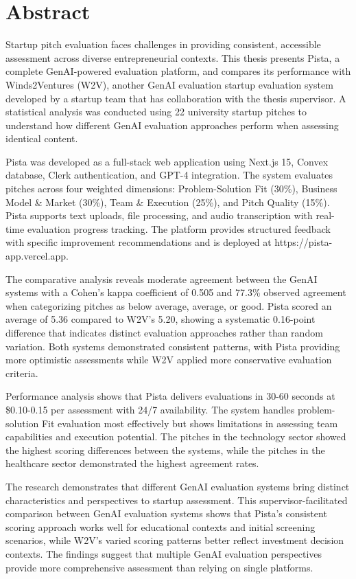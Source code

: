 \chapter*{Abstract}
Startup pitch evaluation faces challenges in providing consistent, accessible assessment across diverse entrepreneurial contexts. This thesis presents Pista, a complete GenAI-powered evaluation platform, and compares its performance with Winds2Ventures (W2V), another GenAI evaluation startup evaluation system developed by a startup team that has collaboration with the thesis supervisor. A statistical analysis was conducted using 22 university startup pitches to understand how different GenAI evaluation approaches perform when assessing identical content.

Pista was developed as a full-stack web application using Next.js 15, Convex database, Clerk authentication, and GPT-4 integration. The system evaluates pitches across four weighted dimensions: Problem-Solution Fit (30\%), Business Model \& Market (30\%), Team \& Execution (25\%), and Pitch Quality (15\%). Pista supports text uploads, file processing, and audio transcription with real-time evaluation progress tracking. The platform provides structured feedback with specific improvement recommendations and is deployed at https://pista-app.vercel.app.

The comparative analysis reveals moderate agreement between the GenAI systems with a Cohen's kappa coefficient of 0.505 and 77.3\% observed agreement when categorizing pitches as below average, average, or good. Pista scored an average of 5.36 compared to W2V's 5.20, showing a systematic 0.16-point difference that indicates distinct evaluation approaches rather than random variation. Both systems demonstrated consistent patterns, with Pista providing more optimistic assessments while W2V applied more conservative evaluation criteria.

Performance analysis shows that Pista delivers evaluations in 30-60 seconds at \$0.10-0.15 per assessment with 24/7 availability. The system handles problem-solution Fit evaluation most effectively but shows limitations in assessing team capabilities and execution potential. The pitches in the technology sector showed the highest scoring differences between the systems, while the pitches in the healthcare sector demonstrated the highest agreement rates.

The research demonstrates that different GenAI evaluation systems bring distinct characteristics and perspectives to startup assessment. This supervisor-facilitated comparison between GenAI evaluation systems shows that Pista's consistent scoring approach works well for educational contexts and initial screening scenarios, while W2V's varied scoring patterns better reflect investment decision contexts. The findings suggest that multiple GenAI evaluation perspectives provide more comprehensive assessment than relying on single platforms.

